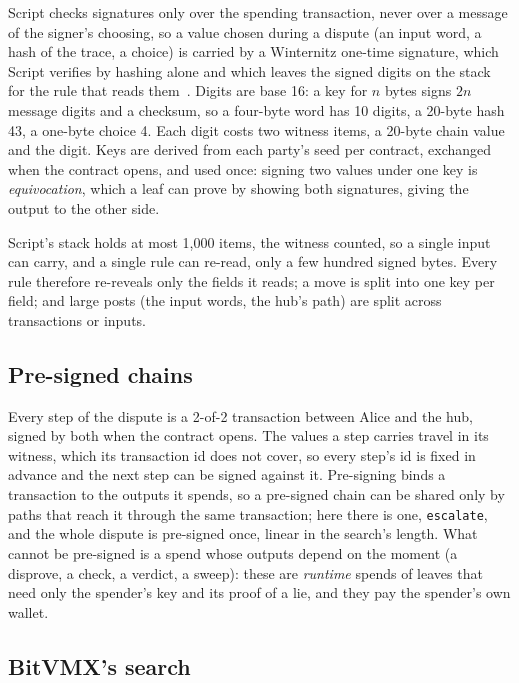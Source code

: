 \documentclass[11pt]{article}
\newcommand{\tx}[1]{\texttt{#1}}
\begin{document}
Script checks signatures only over the spending transaction, never over
a message of the signer's choosing, so a value chosen during a dispute
(an input word, a hash of the trace, a choice) is carried by a
Winternitz one-time signature, which Script verifies by hashing alone
and which leaves the signed digits on the stack for the rule that reads
them~\cite{bitvm,bitvmx}. Digits are base 16: a key for $n$ bytes signs
$2n$ message digits and a checksum, so a four-byte word has 10 digits, a
20-byte hash 43, a one-byte choice 4. Each digit costs two witness items,
a 20-byte chain value and the digit. Keys are derived from each party's
seed per contract, exchanged when the contract opens, and used once:
signing two values under one key is \emph{equivocation}, which a leaf
can prove by showing both signatures, giving the output to the other
side.

Script's stack holds at most 1,000 items, the witness counted, so a
single input can carry, and a single rule can re-read, only a few
hundred signed bytes. Every rule therefore re-reveals only the fields it
reads; a move is split into one key per field; and large posts (the
input words, the hub's path) are split across transactions or inputs.

\subsection{Pre-signed chains}

Every step of the dispute is a 2-of-2 transaction between Alice and the
hub, signed by both when the contract opens. The values a step carries
travel in its witness, which its transaction id does not cover, so every
step's id is fixed in advance and the next step can be signed against
it. Pre-signing binds a transaction to the outputs it spends, so a
pre-signed chain can be shared only by paths that reach it through the
same transaction; here there is one, \tx{escalate}, and the whole
dispute is pre-signed once, linear in the search's length. What cannot
be pre-signed is a spend whose outputs depend on the moment (a
disprove, a check, a verdict, a sweep): these are \emph{runtime} spends
of leaves that need only the spender's key and its proof of a lie, and
they pay the spender's own wallet.

\subsection{BitVMX's search}
\label{sec:search}
\end{document}
